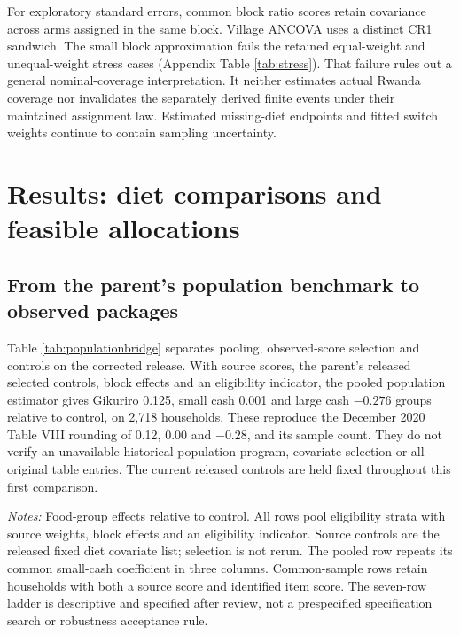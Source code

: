 \documentclass[11pt]{article}
\begin{document}
For exploratory standard errors, common block ratio scores retain covariance across arms assigned in the same block. Village ANCOVA uses a distinct CR1 sandwich. The small block approximation fails the retained equal-weight and unequal-weight stress cases (Appendix Table \ref{tab:stress}). That failure rules out a general nominal-coverage interpretation. It neither estimates actual Rwanda coverage nor invalidates the separately derived finite events under their maintained assignment law. Estimated missing-diet endpoints and fitted switch weights continue to contain sampling uncertainty.

\section{Results: diet comparisons and feasible allocations}

\subsection{From the parent's population benchmark to observed packages}

Table \ref{tab:populationbridge} separates pooling, observed-score selection and controls on the corrected release. With source scores, the parent's released selected controls, block effects and an eligibility indicator, the pooled population estimator gives Gikuriro 0.125, small cash 0.001 and large cash $-0.276$ groups relative to control, on 2,718 households. These reproduce the December 2020 Table VIII rounding of 0.12, 0.00 and $-0.28$, and its sample count. They do not verify an unavailable historical population program, covariate selection or all original table entries. The current released controls are held fixed throughout this first comparison.

\begin{table}[t]
\centering\caption{Parent-style population estimator bridge on the corrected release}\label{tab:populationbridge}
\resizebox{\textwidth}{!}{}
\begin{minipage}{\textwidth}\footnotesize\emph{Notes:} Food-group effects relative to control. All rows pool eligibility strata with source weights, block effects and an eligibility indicator. Source controls are the released fixed diet covariate list; selection is not rerun. The pooled row repeats its common small-cash coefficient in three columns. Common-sample rows retain households with both a source score and identified item score. The seven-row ladder is descriptive and specified after review, not a prespecified specification search or robustness acceptance rule.\end{minipage}
\end{table}
\end{document}
